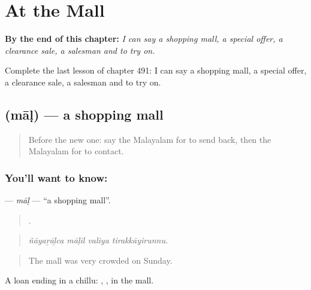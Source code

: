 
\chapter{At the Mall}
\label{ch:ml-at-the-mall}

\begin{chapteropening}
\textbf{By the end of this chapter:} \emph{I can say a shopping mall, a special offer, a clearance sale, a salesman and to try on.}

Complete the last lesson of chapter 491: I can say a shopping mall, a special offer, a clearance sale, a salesman and to try on.
\end{chapteropening}

\section[\texorpdfstring{\ml{മാൾ} (māḷ)}{മാൾ (māḷ)}]{ (māḷ) — a shopping mall}

\label{lesson:ML-C491-mal}



\begin{quote}
Before the new one: say the Malayalam for to send back, then the Malayalam for to contact.
\end{quote}

\subsection*{You'll want to know: }
\textbf{} — \emph{māḷ} — \textquotedblleft{}a shopping mall\textquotedblright{}.

\begin{quote}
   .
\end{quote}

\begin{quote}
\emph{ñāyaṟāḻca māḷil valiya tirakkāyirunnu.}
\end{quote}

\begin{quote}
The mall was very crowded on Sunday.
\end{quote}

A loan ending in a chillu: , , in the mall.

